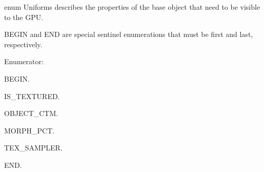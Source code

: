 enum Uniforms describes the properties of the base object that need to be visible to the G\-P\-U. 

B\-E\-G\-I\-N and E\-N\-D are special sentinel enumerations that must be first and last, respectively. \begin{Desc}
\item[Enumerator\-: ]\par
\begin{description}
\item[{\em 
\hypertarget{class_object_a8c11d8700b0bb79a46c61f2de4f23fa3a8a65225741e4db1df295c9cab71a98c0}{B\-E\-G\-I\-N}\label{class_object_a8c11d8700b0bb79a46c61f2de4f23fa3a8a65225741e4db1df295c9cab71a98c0}
}]B\-E\-G\-I\-N. \item[{\em 
\hypertarget{class_object_a8c11d8700b0bb79a46c61f2de4f23fa3a8fecaee23530c9befe7feb5166e81484}{I\-S\-\_\-\-T\-E\-X\-T\-U\-R\-E\-D}\label{class_object_a8c11d8700b0bb79a46c61f2de4f23fa3a8fecaee23530c9befe7feb5166e81484}
}]I\-S\-\_\-\-T\-E\-X\-T\-U\-R\-E\-D. \item[{\em 
\hypertarget{class_object_a8c11d8700b0bb79a46c61f2de4f23fa3a9aaf45d5144b52065016b5b39e909851}{O\-B\-J\-E\-C\-T\-\_\-\-C\-T\-M}\label{class_object_a8c11d8700b0bb79a46c61f2de4f23fa3a9aaf45d5144b52065016b5b39e909851}
}]O\-B\-J\-E\-C\-T\-\_\-\-C\-T\-M. \item[{\em 
\hypertarget{class_object_a8c11d8700b0bb79a46c61f2de4f23fa3ac93e286d52dad730ccf3fdab9b102902}{M\-O\-R\-P\-H\-\_\-\-P\-C\-T}\label{class_object_a8c11d8700b0bb79a46c61f2de4f23fa3ac93e286d52dad730ccf3fdab9b102902}
}]M\-O\-R\-P\-H\-\_\-\-P\-C\-T. \item[{\em 
\hypertarget{class_object_a8c11d8700b0bb79a46c61f2de4f23fa3a85f87adc3e3d4242733729ee87b21423}{T\-E\-X\-\_\-\-S\-A\-M\-P\-L\-E\-R}\label{class_object_a8c11d8700b0bb79a46c61f2de4f23fa3a85f87adc3e3d4242733729ee87b21423}
}]T\-E\-X\-\_\-\-S\-A\-M\-P\-L\-E\-R. \item[{\em 
\hypertarget{class_object_a8c11d8700b0bb79a46c61f2de4f23fa3ad78facbf844c1259f464a49061e1d7ed}{E\-N\-D}\label{class_object_a8c11d8700b0bb79a46c61f2de4f23fa3ad78facbf844c1259f464a49061e1d7ed}
}]E\-N\-D. \end{description}
\end{Desc}



